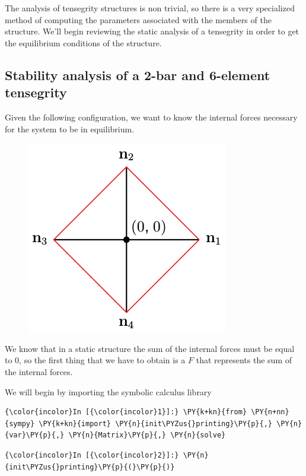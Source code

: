 
The analysis of tensegrity structures is non trivial, so there is a very specialized method of computing the parameters associated with the members of the structure.
We'll begin reviewing the static analysis of a tensegrity in order to get the equilibrium conditions of the structure.

\subsection{Stability analysis of a 2-bar and 6-element tensegrity}


Given the following configuration, we want to know the internal forces
necessary for the system to be in equilibrium.

\begin{figure}[htbp]
    \centering
    \includegraphics{imagenes/7-tensegril/PlanarTensegrity.png}
\end{figure}

We know that in a static structure the sum of the internal forces must
be equal to \(0\), so the first thing that we have to obtain is a \(F\)
that represents the sum of the internal forces.

We will begin by importing the symbolic calculus library

\begin{Verbatim}[commandchars=\\\{\}]
    {\color{incolor}In [{\color{incolor}1}]:} \PY{k+kn}{from} \PY{n+nn}{sympy} \PY{k+kn}{import} \PY{n}{init\PYZus{}printing}\PY{p}{,} \PY{n}{var}\PY{p}{,} \PY{n}{Matrix}\PY{p}{,} \PY{n}{solve}
\end{Verbatim}

\begin{Verbatim}[commandchars=\\\{\}]
    {\color{incolor}In [{\color{incolor}2}]:} \PY{n}{init\PYZus{}printing}\PY{p}{(}\PY{p}{)}
\end{Verbatim}

